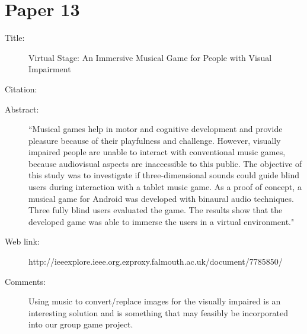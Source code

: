 \documentclass{scrartcl}
\begin{document}
\section*{Paper 13}
\begin{description}
\item[Title:] Virtual Stage: An Immersive Musical Game for People with Visual Impairment
\item[Citation:] \cite{Lotto}
\item[Abstract:] ``Musical games help in motor and cognitive development and provide pleasure because of their playfulness and challenge. However, visually impaired people are unable to interact with conventional music games, because audiovisual aspects are inaccessible to this public. The objective of this study was to investigate if three-dimensional sounds could guide blind users during interaction with a tablet music game. As a proof of concept, a musical game for Android was developed with binaural audio techniques. Three fully blind users evaluated the game. The results show that the developed game was able to immerse the users in a virtual environment."
\item[Web link:]http://ieeexplore.ieee.org.ezproxy.falmouth.ac.uk/document/7785850/
\item[Comments: ]Using music to convert/replace images for the visually impaired is an interesting solution and is something that may feasibly be incorporated into our group game project.
\end{description}
\end{document}
